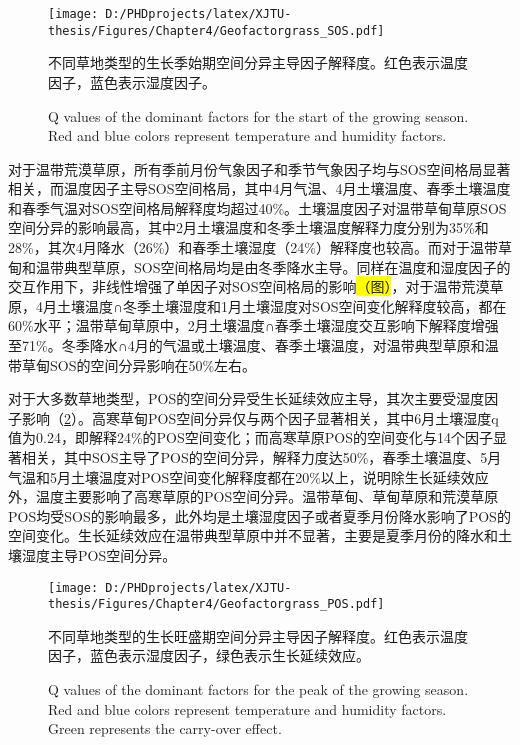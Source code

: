 \renewcommand{\dblfloatpagefraction}{.8}
\begin{figure}[H]
  \centering
  \vspace{-0.1cm}
  \setlength\abovedisplayskip{0pt}
  \texttt{[image: D:/PHDprojects/latex/XJTU-thesis/Figures/Chapter4/Geofactorgrass\_SOS.pdf]}
  \caption{不同草地类型的生长季始期空间分异主导因子解释度。红色表示温度因子，蓝色表示湿度因子。}
  \addtocounter{figure}{-1}
  \vspace{5pt}
  \renewcommand{\figurename}{Fig}
  \caption{Q values of the dominant factors for the start of the growing season. Red and blue colors represent temperature and humidity factors.}
  \label{C4:8}
\end{figure}

对于温带荒漠草原，所有季前月份气象因子和季节气象因子均与SOS空间格局显著相关，而温度因子主导SOS空间格局，其中4月气温、4月土壤温度、春季土壤温度和春季气温对SOS空间格局解释度均超过40\%。土壤温度因子对温带草甸草原SOS空间分异的影响最高，其中2月土壤温度和冬季土壤温度解释力度分别为35\%和28\%，其次4月降水（26\%）和春季土壤湿度（24\%）解释度也较高。而对于温带草甸和温带典型草原，SOS空间格局均是由冬季降水主导。同样在温度和湿度因子的交互作用下，非线性增强了单因子对SOS空间格局的影响\colorbox{yellow}{（图）}，对于温带荒漠草原，4月土壤温度∩冬季土壤湿度和1月土壤湿度对SOS空间变化解释度较高，都在60\%水平；温带草甸草原中，2月土壤温度∩春季土壤湿度交互影响下解释度增强至71\%。冬季降水∩4月的气温或土壤温度、春季土壤温度，对温带典型草原和温带草甸SOS的空间分异影响在50\%左右。

对于大多数草地类型，POS的空间分异受生长延续效应主导，其次主要受湿度因子影响（\cref{C4:10}）。高寒草甸POS空间分异仅与两个因子显著相关，其中6月土壤湿度q值为0.24，即解释24\%的POS空间变化；而高寒草原POS的空间变化与14个因子显著相关，其中SOS主导了POS的空间分异，解释力度达50\%，春季土壤温度、5月气温和5月土壤温度对POS空间变化解释度都在20\%以上，说明除生长延续效应外，温度主要影响了高寒草原的POS空间分异。温带草甸、草甸草原和荒漠草原POS均受SOS的影响最多，此外均是土壤湿度因子或者夏季月份降水影响了POS的空间变化。生长延续效应在温带典型草原中并不显著，主要是夏季月份的降水和土壤湿度主导POS空间分异。

\renewcommand{\dblfloatpagefraction}{.8}
\begin{figure}[H]
  \centering
  \vspace{-0.1cm}
  \setlength\abovedisplayskip{0pt}
  \texttt{[image: D:/PHDprojects/latex/XJTU-thesis/Figures/Chapter4/Geofactorgrass\_POS.pdf]}
  \caption{不同草地类型的生长旺盛期空间分异主导因子解释度。红色表示温度因子，蓝色表示湿度因子，绿色表示生长延续效应。}
  \addtocounter{figure}{-1}
  \vspace{5pt}
  \renewcommand{\figurename}{Fig}
  \caption{Q values of the dominant factors for the peak of the growing season. Red and blue colors represent temperature and humidity factors. Green represents the carry-over effect.}
  \label{C4:10}
\end{figure}

